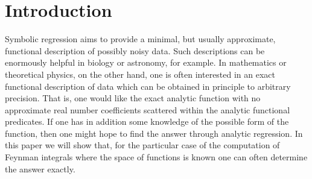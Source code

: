 \documentclass[a4paper,11pt]{article}
\begin{document}
\newcommand{\triangletwol}[3]{
\mbox{\parbox{4cm}{\hspace{0.35cm}
\begin{picture}(3,1.4)
\put(0.3,0.7){\vector(1,0){0.1}}
\put(2.25,-0.175){\vector(-2,1){0.1}}
\put(2.25,1.575){\vector(-2,-1){0.1}}
\put(0.5,0.7){\line(2,1){1.5}}
\put(0.5,0.7){\line(2,-1){1.5}}
\put(2,1.45){\line(0,-1){1.5}}
\put(1.5,1.2){\line(0,-1){1.0}}
\linethickness{0.35mm}
\put(2,1.45){\line(2,1){0.5}}
\put(0,0.7){\line(1,0){0.5}}
\put(2,-0.05){\line(2,-1){0.5}}
\thinlines
\put(0.25,0.9){\makebox(0,0)[b]{$#1$}}
\put(2.2,1.3){\makebox(0,0)[l]{$#2$}}
\put(2.2,0.1){\makebox(0,0)[l]{$#3$}}
\end{picture}
}}
\hfill}


\newcommand{\trianglethreel}[3]{
\mbox{\parbox{4cm}{\hspace{0.35cm}
\begin{picture}(3,1.4)
\put(0.3,0.7){\vector(1,0){0.1}}
\put(2.25,-0.175){\vector(-2,1){0.1}}
\put(2.25,1.575){\vector(-2,-1){0.1}}
\put(0.5,0.7){\line(2,1){1.5}}
\put(0.5,0.7){\line(2,-1){1.5}}
\put(2,1.45){\line(0,-1){1.5}}
\put(1.7,1.3){\line(0,-1){1.2}}
\put(1.3,1.1){\line(0,-1){0.8}}
\linethickness{0.35mm}
\put(2,1.45){\line(2,1){0.5}}
\put(0,0.7){\line(1,0){0.5}}
\put(2,-0.05){\line(2,-1){0.5}}
\thinlines
\put(0.25,0.9){\makebox(0,0)[b]{$#1$}}
\put(2.2,1.3){\makebox(0,0)[l]{$#2$}}
\put(2.2,0.1){\makebox(0,0)[l]{$#3$}}
\end{picture}
}}
\hfill}


\maketitle
\flushbottom


\newpage

\section{Introduction}
Symbolic regression aims to provide a minimal, but usually approximate, functional description of possibly noisy data. Such descriptions can be enormously helpful in biology or astronomy, for example. In mathematics or theoretical physics, on the other hand, one is often interested in an exact functional description of data which can be obtained in principle to arbitrary precision.  That is, one would like the exact analytic function with no approximate real number coefficients scattered within the analytic functional predicates. If one has in addition some knowledge of the possible form of the function, then one might hope to find the answer through analytic regression. In this paper we will show that, for the particular case of the computation of Feynman integrals where the space of functions is known one can often determine the answer exactly.
\end{document}
